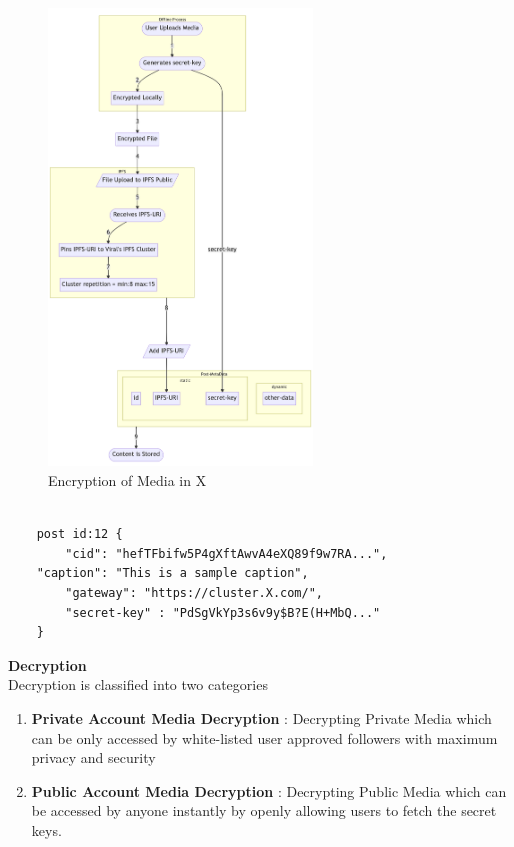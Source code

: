 \documentclass[letterpaper,11pt]{article}
\begin{document}
\begin{figure}[H]
\begin{center}
\includegraphics[width=7cm]{encryption}
\caption{Encryption of Media in X}
\end{center}
\end{figure}

\begin{lstlisting}[caption={Post Meta-Data}, numbers=none]

	post id:12 {
    	"cid": "hefTFbifw5P4gXftAwvA4eXQ89f9w7RA...",
    "caption": "This is a sample caption",
    	"gateway": "https://cluster.X.com/",
    	"secret-key" : "PdSgVkYp3s6v9y$B?E(H+MbQ..."
	}
\end{lstlisting}

\textbf{Decryption}\\

Decryption is classified into two categories
\begin{enumerate}[wide, labelwidth=!, labelindent=0pt]
\item \textbf{Private Account Media Decryption} : Decrypting Private Media which can be only accessed by white-listed user approved followers with maximum privacy and security
\item \textbf{Public Account Media Decryption} : Decrypting Public Media which can be accessed by anyone instantly by openly allowing users to fetch the secret keys.
\end{enumerate}
\end{document}
